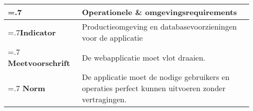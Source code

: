 \noindent
\begin{longtable}{|>{\raggedleft\hsize=.7\hsize\bfseries}X|
    >{\arraybackslash\hsize=1.3\hsize}X|} \hline
\multicolumn{1}{|l|}{\textbf{NFR}} & Operationele \& omgevingsrequirements\\ \hline
Indicator & Productieomgeving en databasevoorzieningen voor de applicatie
 \\  \hline
Meetvoorschrift & De webapplicatie moet vlot draaien.\\ \hline
Norm & De applicatie moet de nodige gebruikers en operaties perfect kunnen uitvoeren zonder vertragingen.\\ \hline
\end{longtable}